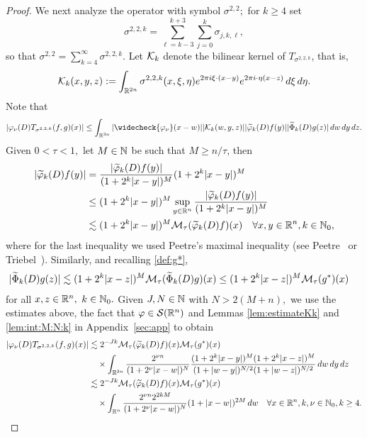 \begin{proof}
We next analyze the operator with  symbol $\sigma^{2,2};$ for $k \geq 4$ set 
\begin{equation*}
\sigma^{2,2,k}  = \sum\limits_{\ell =k-3}^{k+3} \sum\limits_{j=0}^k \sigma_{j,k,\ell},
\end{equation*}
so that $\sigma^{2,2} = \sum\limits_{k=4}^\infty \sigma^{2,2,k}.$ 
 Let $\mathcal{K}_k$ denote the bilinear kernel of  $T_{\sigma^{2,2,k}}$, that is,
$$
\mathcal{K}_k(x,y,z):= \int_{\mathbb{R}^{2n}} \sigma^{2,2,k}(x, \xi, \eta) e^{2\pi i \xi \cdot( x- y)} e^{2\pi i \cdot \eta (x-z)} \, d\xi \, d\eta.
$$
Note that
\begin{align*}
| \f_\nu(D) T_{\sigma^{2,2,k}}(f,g)(x)| \leq \int_{\re^{3n}} |\widecheck{\f_\nu}(x- w)| |\K_k(w, y, z)| |\widetilde{\f}_k(D)f(y)| |\widetilde{\Phi}_k(D)g(z)| \, dw \dy \dz.
\end{align*}
Given $0<\tau <1,$  let $M \in \mathbb{N}$ be such that $M \geq n/\tau$, then
\begin{align*}
|\widetilde{\varphi}_k(D)f(y)|&  = \frac{|\widetilde{\varphi}_k(D)f(y)|}{(1 + 2^k |x-y|)^M} (1 + 2^k |x-y|)^M\\
& \leq  (1 + 2^k |x-y|)^M \sup_{y\in{{\mathbb R}^n}} \frac{|\widetilde{\varphi}_k(D)f(y)|}{(1 + 2^k |x-y|)^M} \\
& \lesssim (1 + 2^k |x-y|)^M \mathcal{M}_\tau(\widetilde{\varphi}_k(D)f)(x)\quad\forall x,y\in{{\mathbb R}^n},k\in\mathbb{N}_0,
\end{align*}
where for the last inequality we used Peetre's maximal inequality (see Peetre~\cite{MR0380394} or Triebel~\cite[p.16, Theorem 1.3.1]{MR3024598}). Similarly, and recalling \eqref{def:g*},
\begin{align*}
|\widetilde{\Phi}_k(D)g(z)| & \lesssim (1 + 2^k |x-z|)^M \mathcal{M}_\tau(\widetilde{\Phi}_k(D)g)(x)  \leq (1 + 2^k |x-z|)^M \mathcal{M}_\tau(g^*)(x)
\end{align*}
for all $ x,z\in{{\mathbb R}^n},$ $k\in\mathbb{N}_0.$
Given $J, N \in \mathbb{N}$ with $N>2(M+n),$  we use the estimates above, the fact that $\varphi\in{\mathcal{S}}({{\mathbb R}^n})$ and Lemmas \ref{lem:estimateKk} and  \ref{lem:int:M:N:k}  in Appendix~\ref{sec:app} to obtain 
\begin{align*}
 |\f_\nu(D) T_{\sigma^{2,2,k}}(f,g)(x)| &\lesssim 2^{-Jk} \Mtau(\widetilde{\f}_k(D)f)(x) \Mtau(g^*)(x)\\
 &\quad\times \int_{\re^{3n}} \frac{2^{\nu n}}{(1+ 2^\nu |x- w|)^N} \frac{(1 + 2^k |x-y|)^M (1 + 2^k |x-z|)^M}{(1+ |w-y|)^{N/2} (1+ |w-z|)^{N/2}} \, dw \dy \dz\\
&\lesssim 2^{-Jk} \Mtau(\widetilde{\f}_k(D)f)(x) \Mtau(g^*)(x)\\
&\quad \times \int_{\rn}  \frac{2^{\nu n} 2^{2kM}}{(1+ 2^\nu |x- w|)^N}(1 +  |x-w|)^{2M} \, dw\quad \forall x\in\rn,k,\nu\in\na_0, k\ge 4.

\end{align*}
\end{proof}
